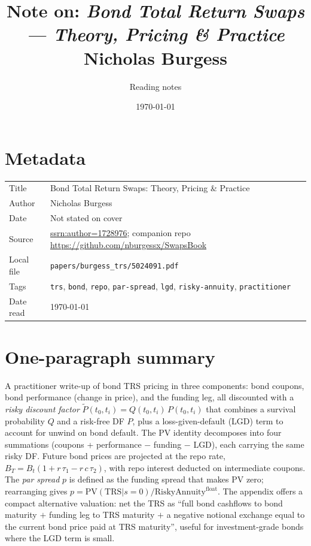 \documentclass[11pt,a4paper]{article}
\title{Note on: \emph{Bond Total Return Swaps --- Theory, Pricing \& Practice}\\
       \large Nicholas Burgess}
\author{Reading notes}
\date{\today}
\begin{document}
\maketitle

\section*{Metadata}
\begin{tabular}{@{}p{3.5cm}p{11cm}@{}}
\toprule
Title           & Bond Total Return Swaps: Theory, Pricing \& Practice \\
Author          & Nicholas Burgess \\
Date            & Not stated on cover \\
Source          & \href{https://ssrn.com/author=1728976}{ssrn:author=1728976};
                  companion repo \url{https://github.com/nburgessx/SwapsBook} \\
Local file      & \texttt{papers/burgess\_trs/5024091.pdf} \\
Tags            & \texttt{trs}, \texttt{bond}, \texttt{repo}, \texttt{par-spread},
                  \texttt{lgd}, \texttt{risky-annuity}, \texttt{practitioner} \\
Date read       & \today \\
\bottomrule
\end{tabular}

\section*{One-paragraph summary}
A practitioner write-up of bond TRS pricing in three components:
bond coupons, bond performance (change in price), and the funding
leg, all discounted with a \emph{risky discount factor}
$\widetilde P(t_0, t_i) = Q(t_0, t_i)\, P(t_0, t_i)$ that combines a
survival probability $Q$ and a risk-free DF $P$, plus a
loss-given-default (LGD) term to account for unwind on bond default.
The PV identity decomposes into four summations
(coupons + performance $-$ funding $-$ LGD), each carrying the same
risky DF. Future bond prices are projected at the repo rate,
$B_T = B_t(1 + r\,\tau_1 - r\,c\,\tau_2)$, with repo interest
deducted on intermediate coupons. The \emph{par spread} $p$ is
defined as the funding spread that makes PV zero; rearranging gives
$p = \mathrm{PV}(\mathrm{TRS}|s=0) / \mathrm{RiskyAnnuity}^{\mathrm{float}}$.
The appendix offers a compact alternative valuation: net the TRS as
``full bond cashflows to bond maturity $+$ funding leg to TRS
maturity $+$ a negative notional exchange equal to the current bond
price paid at TRS maturity'', useful for investment-grade bonds
where the LGD term is small.
\end{document}
